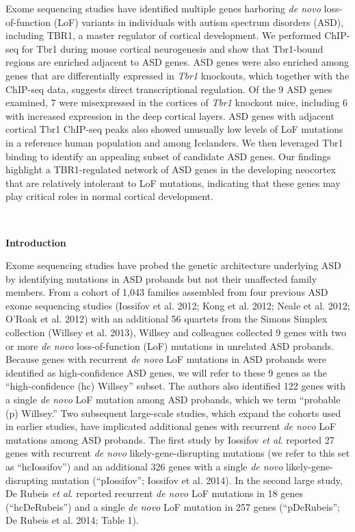 \documentclass[]{article}
\begin{document}
Exome sequencing studies have identified multiple genes harboring
\emph{de novo} loss-of-function (LoF) variants in individuals with
autism spectrum disorders (ASD), including TBR1, a master regulator of
cortical development. We performed ChIP-seq for Tbr1 during mouse
cortical neurogenesis and show that Tbr1-bound regions are enriched
adjacent to ASD genes. ASD genes were also enriched among genes that are
differentially expressed in \emph{Tbr1} knockouts, which together with
the ChIP-seq data, suggests direct transcriptional regulation. Of the 9
ASD genes examined, 7 were misexpressed in the cortices of \emph{Tbr1}
knockout mice, including 6 with increased expression in the deep
cortical layers. ASD genes with adjacent cortical Tbr1 ChIP-seq peaks
also showed unusually low levels of LoF mutations in a reference human
population and among Icelanders. We then leveraged Tbr1 binding to
identify an appealing subset of candidate ASD genes. Our findings
highlight a TBR1-regulated network of ASD genes in the developing
neocortex that are relatively intolerant to LoF mutations, indicating
that these genes may play critical roles in normal cortical development.

\textbf{\\
}

\textbf{Introduction}

Exome sequencing studies have probed the genetic architecture underlying
ASD by identifying mutations in ASD probands but not their unaffected
family members. From a cohort of 1,043 families assembled from four
previous ASD exome sequencing studies (Iossifov et al. 2012; Kong et al.
2012; Neale et al. 2012; O'Roak et al. 2012) with an additional 56
quartets from the Simons Simplex collection (Willsey et al. 2013),
Willsey and colleagues collected 9 genes with two or more \emph{de novo}
loss-of-function (LoF) mutations in unrelated ASD probands. Because
genes with recurrent \emph{de novo} LoF mutations in ASD probands were
identified as high-confidence ASD genes, we will refer to these 9 genes
as the ``high-confidence (hc) Willsey'' subset. The authors also
identified 122 genes with a single \emph{de novo} LoF mutation among ASD
probands, which we term ``probable (p) Willsey.'' Two subsequent
large-scale studies, which expand the cohorts used in earlier studies,
have implicated additional genes with recurrent \emph{de novo} LoF
mutations among ASD probands. The first study by Iossifov \emph{et al}.
reported 27 genes with recurrent \emph{de novo} likely-gene-disrupting
mutations (we refer to this set as ``hcIossifov'') and an additional 326
genes with a single \emph{de novo} likely-gene-disrupting mutation
(``pIossifov''; Iossifov et al. 2014). In the second large study, De
Rubeis \emph{et al}. reported recurrent \emph{de novo} LoF mutations in
18 genes (``hcDeRubeis'') and a single \emph{de novo} LoF mutation in
257 genes (``pDeRubeis''; De Rubeis et al. 2014; Table 1).
\end{document}
